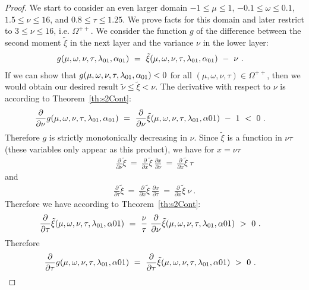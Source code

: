 \documentclass{article}
\newcommand\nunn{{\tilde \nu}}
\newcommand\xinn{{\tilde \xi}}
\renewcommand{\leq}{\leqslant}
\begin{document}
\begin{proof}
We start to consider an even larger domain
$-1 \leq \mu \leq 1$, 
$-0.1 \leq \omega \leq 0.1$,
$1.5 \leq \nu \leq 16$, and 
$0.8 \leq \tau \leq 1.25$.
We prove facts for this domain and later restrict to
$3 \leq \nu \leq 16$, i.e. $\Omega^{++}$.
We consider the function $g$ of the difference between the second moment $\xinn$ in the next layer
and the variance $\nu$ in the lower layer:
\begin{align}
g(\mu,\omega,\nu,\tau,\lambda_{\rm 01},\alpha_{\rm 01}) \ &= \
    \xinn(\mu,\omega,\nu,\tau,\lambda_{\rm 01},\alpha_{\rm 01})
    \ - \ \nu \ .
\end{align}
If we can show that $g(\mu,\omega,\nu,\tau,\lambda_{\rm 01},\alpha_{\rm 01}) < 0$ for 
all $(\mu,\omega,\nu,\tau) \in \Omega^{++}$, then
we would obtain our desired result $\nunn \leq \xinn < \nu$. 
The derivative with respect to $\nu$ is according to Theorem~\ref{th:s2Cont}:
\begin{align}
\frac{\partial}{\partial \nu}g(\mu,\omega,\nu,\tau,\lambda_{\rm 01},\alpha_{\rm 01}) \ &= \ 
\frac{\partial}{\partial \nu}\xinn(\mu,\omega,\nu,\tau,\lambda_{\rm 01},\alpha{\rm 01}) \ - \ 1 \ < \ 0 \ .
\end{align}
Therefore $g$ is strictly monotonically decreasing in $\nu$.
Since $\xinn$ is a function in $\nu \tau$
(these variables only appear as this product), we
have for $x=\nu \tau$
\begin{align}
\frac{\partial}{\partial
\nu}\xinn \ = \ \frac{\partial}{\partial
x}\xinn \ \frac{\partial x}{\partial
\nu} \ = \ \frac{\partial}{\partial
x}\xinn \ \tau
\end{align}
and 
\begin{align}
\frac{\partial}{\partial
\tau}\xinn \ = \ \frac{\partial}{\partial
x}\xinn \ \frac{\partial x}{\partial
\tau} \ = \ \frac{\partial}{\partial
x}\xinn \ \nu \ .
\end{align}
Therefore we have according to Theorem~\ref{th:s2Cont}:
\begin{align}
\frac{\partial}{\partial
\tau}\xinn(\mu,\omega,\nu,\tau,\lambda_{\rm 01},\alpha{\rm 01} ) \ &= \ \frac{\nu}{\tau} \ \frac{\partial}{\partial
\nu}\xinn(\mu,\omega,\nu,\tau,\lambda_{\rm 01},\alpha{\rm 01} ) \ > \ 0 \ .
\end{align}
Therefore
\begin{align}
\frac{\partial}{\partial
\tau}g(\mu,\omega,\nu,\tau,\lambda_{\rm 01},\alpha{\rm 01} ) \ &= \ 
\frac{\partial}{\partial
\tau}\xinn(\mu,\omega,\nu,\tau,\lambda_{\rm 01},\alpha{\rm 01})\ > \ 0 \ .

\end{align}
\end{proof}
\end{document}

